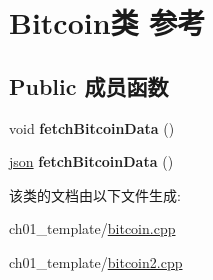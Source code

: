 \hypertarget{class_bitcoin}{}\section{Bitcoin类 参考}
\label{class_bitcoin}
\subsection*{Public 成员函数}
\begin{DoxyCompactItemize}
\item 
\mbox{\label{class_bitcoin_a8599f89b61cf27ffd6ec02ae599093ae}} 
void {\bfseries fetch\+Bitcoin\+Data} ()
\item 
\mbox{\label{class_bitcoin_af4f0adfc205e84ee0dd0415bb04e5abf}} 
\mbox{\hyperlink{classnlohmann_1_1basic__json}{json}} {\bfseries fetch\+Bitcoin\+Data} ()
\end{DoxyCompactItemize}


该类的文档由以下文件生成\+:\begin{DoxyCompactItemize}
\item 
ch01\+\_\+template/\mbox{\hyperlink{bitcoin_8cpp}{bitcoin.\+cpp}}\item 
ch01\+\_\+template/\mbox{\hyperlink{bitcoin2_8cpp}{bitcoin2.\+cpp}}\end{DoxyCompactItemize}
